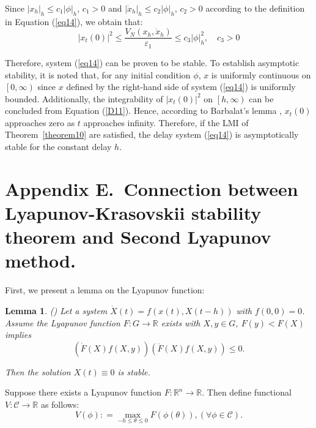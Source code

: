 \documentclass[a4paper]{cas-sc}
\newtheorem{lemma}[theorem]{Lemma}
\begin{document}
Since ${\left| {{x_h}} \right|_h} \leqslant {c_1}|\phi {|_h}$, ${c_1} > 0$ \citep{Hale2013} and ${\left| {{{\dot x}_h}} \right|_h} \leqslant {c_2}|\phi {|_h}$, ${c_2} > 0$ according to the definition in Equation (\ref{eq14}), we obtain that:
\begin{equation}
  {\left| {{x_t}(0)} \right|^2} \leqslant \frac{{{V_N}\left( {{x_h},{{\dot x}_h}} \right)}}{{{\varepsilon _1}}} \leqslant {c_3}|\phi |_h^2,\quad {c_3} > 0
  \label{D13}
\end{equation}

Therefore, system (\ref{eq14}) can be proven to be stable. To establish asymptotic stability, it is noted that, for any initial condition $\phi $, $x$ is uniformly continuous on $\left[ {0,\infty } \right)$ since $x$ defined by the right-hand side of system (\ref{eq14}) is uniformly bounded. Additionally, the integrability of ${\left| {{x_t}(0)} \right|^2}$ on $\left[ {h,\infty } \right)$ can be concluded from Equation (\ref{D11}). Hence, according to Barbalat's lemma \citep{Min2007}, ${x_t}(0)$ approaches zero as $t$ approaches infinity. Therefore, if the LMI of Theorem~\ref{theorem10} are satisfied, the delay system (\ref{eq14}) is asymptotically stable for the constant delay $h$.


\section*{Appendix E.~Connection between Lyapunov-Krasovskii stability theorem and Second Lyapunov method.}
\label{AppendixE}
First, we present a lemma on the Lyapunov function:
\begin{lemma}
  \label{lemmaYY}
  (\citep{Kolmanovskii1999}) Let a system $\dot{X}(t)=f(x(t), X(t-h))$ with $f\left(0,0 \right)= 0$. Assume the Lyapunov function $F:G\rightarrow\mathbb{R}$ exists with $X,y\in G$, $F\left(y\right)<F\left(X\right)$ implies
  \begin{equation}
    \left(\dot{F}\left(X\right)f\left(X,y\right)\right)\left(\ddot{F}\left(X\right)f\left(X,y\right)\right)\le0.
  \end{equation}

  Then the solution $X(t)\equiv0$ is stable.
\end{lemma}

Suppose there exists a Lyapunov function $F:\mathbb{R}^n\rightarrow\mathbb{R}$. Then define functional $V:\mathcal{C}\rightarrow\mathbb{R}$ as follows:
\begin{equation}
  V(\phi ): = \mathop {\max }\limits_{ - h \le \theta  \le 0} F(\phi (\theta )),(\forall \phi  \in \mathcal{C}).
  \label{yy1}
\end{equation}
\end{document}

